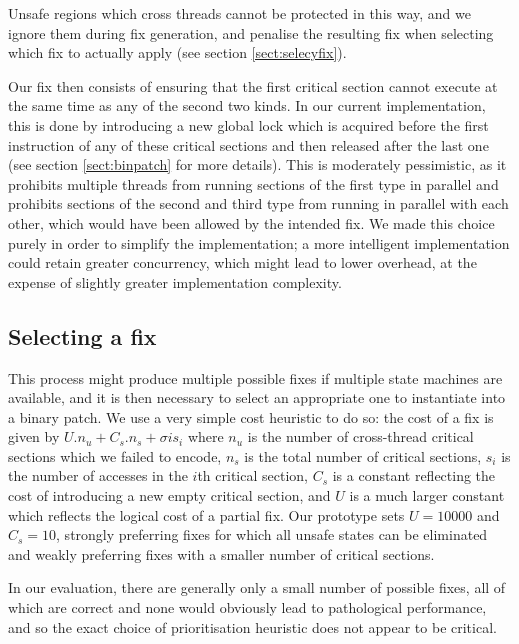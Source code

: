 \documentclass[10pt,twocolumn,preprint,natbib,authoryear]{sigplanconf}
\begin{document}
Unsafe regions which cross threads cannot be protected in this way,
and we ignore them during fix generation, and penalise the resulting
fix when selecting which fix to actually apply (see section
\ref{sect:selecyfix}).

Our fix then consists of ensuring that the first critical section
cannot execute at the same time as any of the second two kinds.  In
our current implementation, this is done by introducing a new global
lock which is acquired before the first instruction of any of these
critical sections and then released after the last one (see section
\ref{sect:binpatch} for more details).  This is moderately
pessimistic, as it prohibits multiple threads from running sections of
the first type in parallel and prohibits sections of the second and
third type from running in parallel with each other, which would have
been allowed by the intended fix.  We made this choice purely in order
to simplify the implementation; a more intelligent implementation
could retain greater concurrency, which might lead to lower overhead,
at the expense of slightly greater implementation complexity.

\subsection{Selecting a fix}
\label{sect:selectfix}

This process might produce multiple possible fixes if multiple state
machines are available, and it is then necessary to select an
appropriate one to instantiate into a binary patch.  We use a very
simple cost heuristic to do so: the cost of a fix is given by $U.n_u +
C_s.n_s + {\sigma{}{i}}s_i$ where $n_u$ is the number of cross-thread
critical sections which we failed to encode, $n_s$ is the total number
of critical sections, $s_i$ is the number of accesses in the $i$th
critical section, $C_s$ is a constant reflecting the cost of
introducing a new empty critical section, and $U$ is a much larger
constant which reflects the logical cost of a partial fix.  Our
prototype sets $U=10000$ and $C_s=10$, strongly preferring fixes for
which all unsafe states can be eliminated and weakly preferring fixes
with a smaller number of critical sections.

In our evaluation, there are generally only a small number of possible
fixes, all of which are correct and none would obviously lead to
pathological performance, and so the exact choice of prioritisation
heuristic does not appear to be critical.
\end{document}
